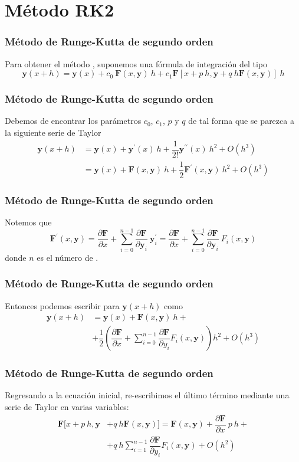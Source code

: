 \section{Método RK2}
\begin{frame}
\frametitle{Método de Runge-Kutta de segundo orden}
Para obtener el método , suponemos una fórmula de integración del tipo
\fontsize{12}{12}\selectfont
\[ \mathbf{y}(x + h) = \mathbf{y}(x) + c_{0} \: \mathbf{F}(x,\mathbf{y}) \: h + c_{1} \mathbf{F}[x + p \: h, \mathbf{y} + q \: h \mathbf{F}(x, \mathbf{y})] \: h \]
\end{frame}
\begin{frame}
\frametitle{Método de Runge-Kutta de segundo orden}
Debemos de encontrar los parámetros $c_{0}$, $c_{1}$, $p$ y $q$ de tal forma que se parezca a la siguiente serie de Taylor
\begin{align*}
\mathbf{y}(x + h) &= \mathbf{y}(x) + \mathbf{y}^{\prime}(x) \: h + \dfrac{1}{2!}\mathbf{y}^{\prime \prime}(x) \: h^{2} + O(h^{3}) \\
&= \mathbf{y}(x) + \mathbf{F}(x,\mathbf{y}) \: h + \dfrac{1}{2}\mathbf{F}^{\prime}(x,\mathbf{y}) \: h^{2} + O(h^{3})
\end{align*}
\end{frame}
\begin{frame}
\frametitle{Método de Runge-Kutta de segundo orden}
Notemos que
\[ \mathbf{F}^{\prime}(x,\mathbf{y}) = \dfrac{\partial \mathbf{F}}{\partial x} + \sum_{i = 0}^{n - 1} \dfrac{\partial \mathbf{F}}{\partial \mathbf{y}_{i}} \: \mathbf{y}^{\prime}_{i} = \dfrac{\partial \mathbf{F}}{\partial x} + \sum_{i = 0}^{n - 1} \dfrac{\partial \mathbf{F}}{\partial \mathbf{y}_{i}} \: F_{i}(x, \mathbf{y})\]
donde $n$ es el número de .
\end{frame}
\begin{frame}
\frametitle{Método de Runge-Kutta de segundo orden}
Entonces podemos escribir para $\mathbf{y}(x + h)$ como
\begin{align*}
\mathbf{y}(x + h) &= \mathbf{y}(x) + \mathbf{F}(x,\mathbf{y}) \: h + \\
&+ \dfrac{1}{2} \left( \dfrac{\partial \mathbf{F}}{\partial x} + \sum_{i=0}^{n-1} \dfrac{\partial \mathbf{F}}{\partial y_{i}} F_{i}(x,\mathbf{y}) \right) h^{2} + O(h^{3})
\end{align*}
\end{frame}
\begin{frame}
\frametitle{Método de Runge-Kutta de segundo orden}
Regresando a la ecuación inicial, re-escribimos el último término mediante una serie de Taylor en varias variables:
\begin{align*}
 \mathbf{F}[x + p \: h, \mathbf{y} &+ q \: h \mathbf{F}(x, \mathbf{y})] = \mathbf{F}(x,\mathbf{y}) + \dfrac{\partial \mathbf{F}}{\partial x} \: p \: h + \\
 &+ q \: h \sum_{i=1}^{n-1} \dfrac{\partial \mathbf{F}}{\partial y_{i}} F_{i}(x,\mathbf{y}) + O(h^{2})
\end{align*}
\end{frame}
